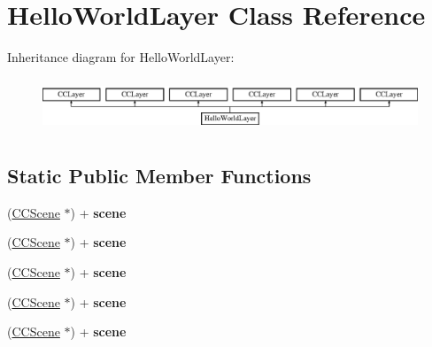 \hypertarget{interface_hello_world_layer}{\section{Hello\-World\-Layer Class Reference}
\label{interface_hello_world_layer}
}
Inheritance diagram for Hello\-World\-Layer\-:\begin{figure}[H]
\begin{center}
\leavevmode
\includegraphics[height=1.623188cm]{interface_hello_world_layer}
\end{center}
\end{figure}
\subsection*{Static Public Member Functions}
\begin{DoxyCompactItemize}
\item 
\hypertarget{interface_hello_world_layer_ad24c1f530a4440d5a12c0aa9b1c47044}{(\hyperlink{interface_c_c_scene}{C\-C\-Scene} $\ast$) + {\bfseries scene}}\label{interface_hello_world_layer_ad24c1f530a4440d5a12c0aa9b1c47044}

\item 
\hypertarget{interface_hello_world_layer_ad24c1f530a4440d5a12c0aa9b1c47044}{(\hyperlink{interface_c_c_scene}{C\-C\-Scene} $\ast$) + {\bfseries scene}}\label{interface_hello_world_layer_ad24c1f530a4440d5a12c0aa9b1c47044}

\item 
\hypertarget{interface_hello_world_layer_ad24c1f530a4440d5a12c0aa9b1c47044}{(\hyperlink{interface_c_c_scene}{C\-C\-Scene} $\ast$) + {\bfseries scene}}\label{interface_hello_world_layer_ad24c1f530a4440d5a12c0aa9b1c47044}

\item 
\hypertarget{interface_hello_world_layer_ad24c1f530a4440d5a12c0aa9b1c47044}{(\hyperlink{interface_c_c_scene}{C\-C\-Scene} $\ast$) + {\bfseries scene}}\label{interface_hello_world_layer_ad24c1f530a4440d5a12c0aa9b1c47044}

\item 
\hypertarget{interface_hello_world_layer_ad24c1f530a4440d5a12c0aa9b1c47044}{(\hyperlink{interface_c_c_scene}{C\-C\-Scene} $\ast$) + {\bfseries scene}}\label{interface_hello_world_layer_ad24c1f530a4440d5a12c0aa9b1c47044}

\end{DoxyCompactItemize}

